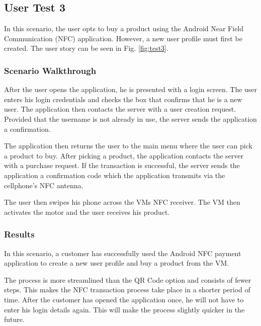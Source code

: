 \subsection{User Test 3}

In this scenario, the user opts to buy a product using the Android Near Field
Communication (NFC) application. However, a new user profile must first be created. The user story
can be seen in Fig. \ref{fig:test3}.

\subsubsection{Scenario Walkthrough}

After the user opens the application, he is presented with a login screen. The
user enters his login credentials and checks the box that confirms that he is a
new user. The application then contacts the server with a user creation
request. Provided that the username is not already in use, the server sends the
application a confirmation.

The application then returns the user to the main menu where the user can pick
a product to buy. After picking a product, the application contacts the server
with a purchase request. If the transaction is successful, the server sends the
application a confirmation code which the application transmits via the
cellphone's NFC antenna.

The user then swipes his phone across the VMs NFC receiver. The
VM then activates the motor and the user receives his product. 

\subsubsection{Results}

In this scenario, a customer has successfully used the Android NFC payment application to
create a new user profile and buy a product from the VM. 

The process is more streamlined than the QR Code option and consists of fewer steps. This
makes the NFC transaction process take place in a shorter period of time. After the
customer has opened the application once, he will not have to enter his login details
again. This will make the process slightly quicker in the future.  

